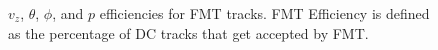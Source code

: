         \begin{figure}[t!]
            \centering{}
            \caption[$v_z$, $\theta$, $\phi$, and $p$ efficiencies for FMT tracks, run 12016]{$v_z$, $\theta$, $\phi$, and $p$ efficiencies for FMT tracks. FMT Efficiency is defined as the percentage of DC tracks that get accepted by FMT.}
            \label{fig::fmt_efficiencies}
        \end{figure}
